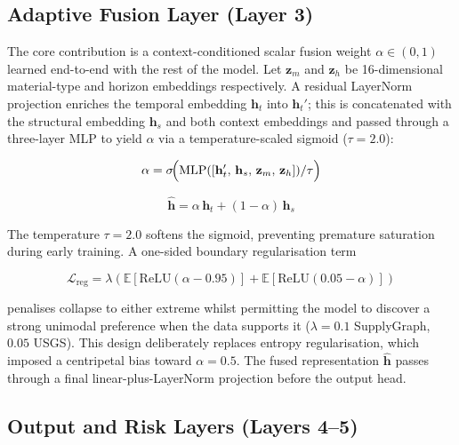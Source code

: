 \subsection{Adaptive Fusion Layer (Layer 3)}

The core contribution is a context-conditioned scalar fusion weight
$\alpha \in (0,1)$ learned end-to-end with the rest of the model.
Let $\mathbf{z}_m$ and $\mathbf{z}_h$ be 16-dimensional material-type
and horizon embeddings respectively. A residual LayerNorm projection
enriches the temporal embedding $\mathbf{h}_t$ into $\mathbf{h}_t'$;
this is concatenated with the structural embedding $\mathbf{h}_s$ and
both context embeddings and passed through a three-layer MLP to yield
$\alpha$ via a temperature-scaled sigmoid ($\tau{=}2.0$):

\begin{equation}
  \alpha = \sigma\!\Bigl(\mathrm{MLP}([\mathbf{h}_t',\,\mathbf{h}_s,\,
           \mathbf{z}_m,\,\mathbf{z}_h]) / \tau\Bigr)
  \label{eq:alpha}
\end{equation}

\begin{equation}
  \hat{\mathbf{h}} = \alpha\,\mathbf{h}_t + (1-\alpha)\,\mathbf{h}_s
  \label{eq:fused}
\end{equation}

\noindent The temperature $\tau{=}2.0$ softens the sigmoid, preventing
premature saturation during early training. A one-sided boundary
regularisation term

\begin{equation}
  \mathcal{L}_{\mathrm{reg}} = \lambda\!\left(
    \mathbb{E}[\mathrm{ReLU}(\alpha - 0.95)]
    + \mathbb{E}[\mathrm{ReLU}(0.05 - \alpha)]
  \right)
  \label{eq:reg}
\end{equation}

\noindent penalises collapse to either extreme whilst permitting
the model to discover a strong unimodal preference when the data
supports it ($\lambda{=}0.1$ SupplyGraph, $0.05$ USGS). This
design deliberately replaces entropy regularisation, which imposed
a centripetal bias toward $\alpha{=}0.5$. The fused representation
$\hat{\mathbf{h}}$ passes through a final linear-plus-LayerNorm
projection before the output head.

\subsection{Output and Risk Layers (Layers 4--5)}

